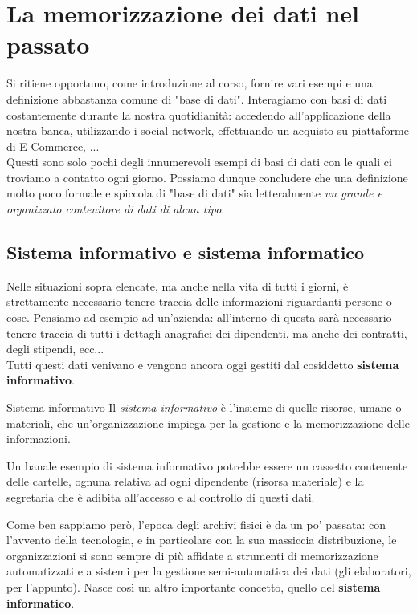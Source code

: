 \documentclass[12pt]{report}
\begin{document}
	
	
	\chapter{La memorizzazione dei dati nel passato}
	Si ritiene opportuno, come introduzione al corso, fornire vari esempi e una definizione abbastanza comune di "base di dati".
	Interagiamo con basi di dati costantemente durante la nostra quotidianità: accedendo all'applicazione della nostra banca, utilizzando i social network, effettuando un acquisto su piattaforme di E-Commerce, ...\\
	Questi sono solo pochi degli innumerevoli esempi di basi di dati con le quali ci troviamo a contatto ogni giorno. Possiamo dunque concludere che una definizione molto poco formale e spiccola di "base di dati" sia letteralmente \textit{un grande e organizzato contenitore di dati di alcun tipo}.
	
	\section{Sistema informativo e sistema informatico}
	Nelle situazioni sopra elencate, ma anche nella vita di tutti i giorni, è strettamente necessario tenere traccia delle informazioni riguardanti persone o cose. Pensiamo ad esempio ad un'azienda: all'interno di questa sarà necessario tenere traccia di tutti i dettagli anagrafici dei dipendenti, ma anche dei contratti, degli stipendi, ecc...\\
	Tutti questi dati venivano e vengono ancora oggi gestiti dal cosiddetto \textbf{sistema informativo}.
	
	\begin{definizione}{Sistema informativo}{}
		Il \textit{sistema informativo} è l'insieme di quelle risorse, umane o materiali, che un'organizzazione impiega per la gestione e la memorizzazione delle informazioni.
		
		Un banale esempio di sistema informativo potrebbe essere un cassetto contenente delle cartelle, ognuna relativa ad ogni dipendente (risorsa materiale) e la segretaria che è adibita all'accesso e al controllo di questi dati.
	\end{definizione}
	
	Come ben sappiamo però, l'epoca degli archivi fisici è da un po' passata: con l'avvento della tecnologia, e in particolare con la sua massiccia distribuzione, le organizzazioni si sono sempre di più affidate a strumenti di memorizzazione automatizzati e a sistemi per la gestione semi-automatica dei dati (gli elaboratori, per l'appunto).
	Nasce così un altro importante concetto, quello del \textbf{sistema informatico}.
	
\end{document}
